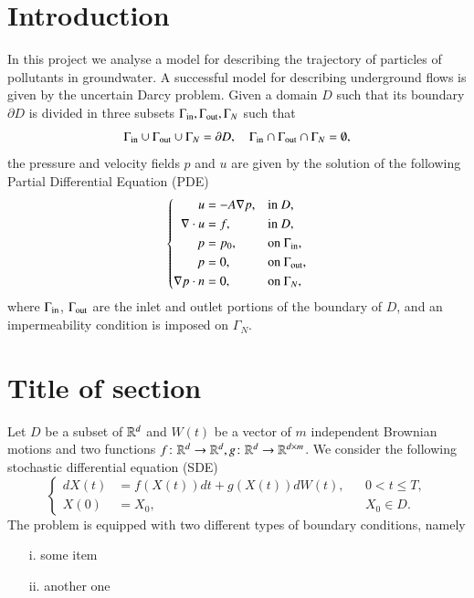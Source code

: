 \documentclass{article}
\date{\today}
\begin{document}


\clearpage
\thispagestyle{empty}
\tableofcontents

\clearpage
{}
\setcounter{page}{1}

\section{Introduction}
In this project we analyse a model for describing the trajectory of particles of pollutants in groundwater. A successful model for describing underground flows is given by the uncertain Darcy problem. Given a domain $D$ such that its boundary $\partial D$ is divided in three subsets $\Gamma_{\rm in}, \Gamma_{\rm out}, \Gamma_N$ such that 
\begin{equation*}
	\Gamma_{\rm in} \cup \Gamma_{\rm out} \cup \Gamma_N = \partial D, \quad \Gamma_{\rm in} \cap \Gamma_{\rm out} \cap \Gamma_N = \emptyset,
\end{equation*} 
the pressure and velocity fields $p$ and $u$ are given by the solution of the following Partial Differential Equation (PDE)
\begin{equation}
	\label{eq:IntroDarcy}
	\left \{
	\begin{aligned}
		u &= -A \nabla p, && \text{in } D, \\
		\nabla\cdot u &= f, && \text{in } D, \\
		p &= p_0, && \text{on } \Gamma_{\rm in},\\
		p &= 0, && \text{on } \Gamma_{\rm out}, \\
		\nabla p \cdot n &= 0, && \text{on } \Gamma_N,
	\end{aligned} \right.
\end{equation}
where $\Gamma_{\rm in}$, $\Gamma_{\rm out}$ are the inlet and outlet portions of the boundary of $D$, and an impermeability condition is imposed on $\Gamma_N$.

\section{Title of section}
Let $D$ be a subset of $\mathbb{R}^d$ and $W(t)$ be a vector of $m$ independent Brownian motions and two functions $f\colon \mathbb{R}^d \rightarrow \mathbb{R}^d, g \colon \mathbb{R}^d \rightarrow \mathbb{R}^{d\times m}$. We consider the following stochastic differential equation (SDE)
\begin{equation}\label{eq:GeneralModel}
\left \{
\begin{aligned}
dX(t) &= f(X(t)) dt + g(X(t))dW(t), && 0 < t \leq T, \\
X(0)  &= X_0, && X_0 \in D.
\end{aligned} \right .
\end{equation}
The problem is equipped with two different types of boundary conditions, namely
\begin{itemize}
	\item[i.] some item
	\item[ii.] another one
\end{itemize}
\end{document}

